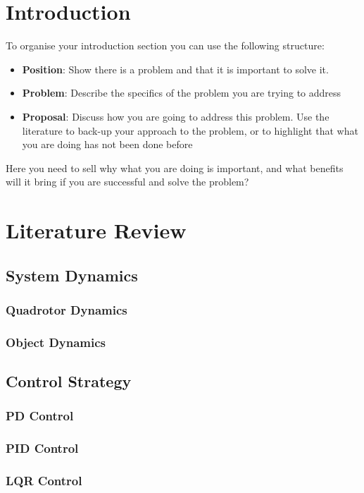 \documentclass{UoNMCHA}
\numberwithin{equation}{section}
\begin{document}
\section{Introduction}
To organise your introduction section you can use the following structure:
\begin{itemize}
    \item \textbf{Position}: Show there is a problem and that it is important to solve it.
    \item \textbf{Problem}: Describe the specifics of the problem you are trying to address
    \item \textbf{Proposal}: Discuss how you are going to address this problem. Use the literature to back-up your approach to the problem, or to highlight that what you are doing has not been done before
\end{itemize}
Here you need to sell why what you are doing is important, and what benefits will it bring if you are successful and solve the problem? 



\section{Literature Review}
\subsection{System Dynamics}
\subsubsection{Quadrotor Dynamics}
\subsubsection{Object Dynamics}
\subsection{Control Strategy}
\subsubsection{PD Control}
\subsubsection{PID Control}
\subsubsection{LQR Control}
\end{document}
